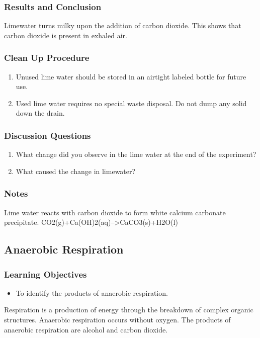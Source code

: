 \subsubsection*{Results and Conclusion}
Limewater turns milky upon the addition of carbon dioxide. This shows that carbon dioxide is present in exhaled air.

\subsubsection*{Clean Up Procedure}
\begin{enumerate}
\item{Unused lime water should be stored in an airtight labeled bottle for future use.}
\item{Used lime water requires no special waste disposal. Do not dump any solid down the drain.}
\end{enumerate}

\subsubsection*{Discussion Questions}
\begin{enumerate}
\item{What change did you observe in the lime water at the end of the experiment?}
\item{What caused the change in limewater?}
\end{enumerate}

\subsubsection*{Notes}
Lime water reacts with carbon dioxide to form white calcium carbonate precipitate.
CO2(g)+Ca(OH)2(aq)-->CaCO3(s)+H2O(l)


\subsection{Anaerobic Respiration}

\subsubsection*{Learning Objectives}
\begin{itemize}
\item{To identify the products of anaerobic respiration.}
\end{itemize}


Respiration is a production of energy through the breakdown of complex organic structures. Anaerobic respiration occurs without oxygen. The products of anaerobic respiration are alcohol and carbon dioxide.

